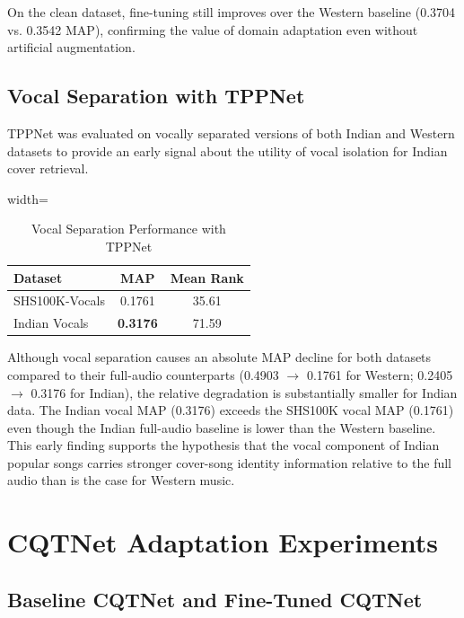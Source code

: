 \documentclass[conference]{IEEEtran}
\begin{document}
On the clean dataset, fine-tuning still improves over the Western baseline (0.3704 vs. 0.3542 MAP), confirming the value of domain adaptation even without artificial augmentation.

\subsection{Vocal Separation with TPPNet}

TPPNet was evaluated on vocally separated versions of both Indian and Western datasets to provide an early signal about the utility of vocal isolation for Indian cover retrieval.

\begin{table}[htbp]
    \caption{Vocal Separation Performance with TPPNet}
    \label{tab:tppnet_vocal}
    \centering
    \begin{adjustbox}{width=\columnwidth}
    \begin{tabular}{lcc}
    \toprule
    \textbf{Dataset} & \textbf{MAP} & \textbf{Mean Rank} \\
    \midrule
    SHS100K-Vocals  & 0.1761 & 35.61 \\
    Indian Vocals   & \textbf{0.3176} & 71.59 \\
    \bottomrule
    \end{tabular}
    \end{adjustbox}
\end{table}

Although vocal separation causes an absolute MAP decline for both datasets compared to their full-audio counterparts (0.4903 $\rightarrow$ 0.1761 for Western; 0.2405 $\rightarrow$ 0.3176 for Indian), the relative degradation is substantially smaller for Indian data. The Indian vocal MAP (0.3176) exceeds the SHS100K vocal MAP (0.1761) even though the Indian full-audio baseline is lower than the Western baseline. This early finding supports the hypothesis that the vocal component of Indian popular songs carries stronger cover-song identity information relative to the full audio than is the case for Western music.


\section{CQTNet Adaptation Experiments}

\subsection{Baseline CQTNet and Fine-Tuned CQTNet}
\end{document}
